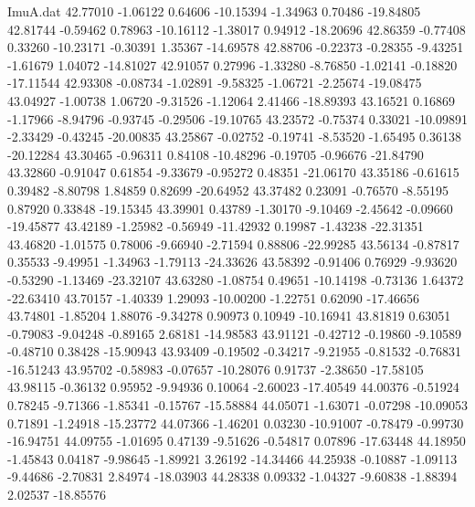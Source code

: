 \begin{filecontents}{ImuA.dat}
  42.77010   -1.06122    0.64606  -10.15394   -1.34963    0.70486  -19.84805
  42.81744   -0.59462    0.78963  -10.16112   -1.38017    0.94912  -18.20696
  42.86359   -0.77408    0.33260  -10.23171   -0.30391    1.35367  -14.69578
  42.88706   -0.22373   -0.28355   -9.43251   -1.61679    1.04072  -14.81027
  42.91057    0.27996   -1.33280   -8.76850   -1.02141   -0.18820  -17.11544
  42.93308   -0.08734   -1.02891   -9.58325   -1.06721   -2.25674  -19.08475
  43.04927   -1.00738    1.06720   -9.31526   -1.12064    2.41466  -18.89393
  43.16521    0.16869   -1.17966   -8.94796   -0.93745   -0.29506  -19.10765
  43.23572   -0.75374    0.33021  -10.09891   -2.33429   -0.43245  -20.00835
  43.25867   -0.02752   -0.19741   -8.53520   -1.65495    0.36138  -20.12284
  43.30465   -0.96311    0.84108  -10.48296   -0.19705   -0.96676  -21.84790
  43.32860   -0.91047    0.61854   -9.33679   -0.95272    0.48351  -21.06170
  43.35186   -0.61615    0.39482   -8.80798    1.84859    0.82699  -20.64952
  43.37482    0.23091   -0.76570   -8.55195    0.87920    0.33848  -19.15345
  43.39901    0.43789   -1.30170   -9.10469   -2.45642   -0.09660  -19.45877
  43.42189   -1.25982   -0.56949  -11.42932    0.19987   -1.43238  -22.31351
  43.46820   -1.01575    0.78006   -9.66940   -2.71594    0.88806  -22.99285
  43.56134   -0.87817    0.35533   -9.49951   -1.34963   -1.79113  -24.33626
  43.58392   -0.91406    0.76929   -9.93620   -0.53290   -1.13469  -23.32107
  43.63280   -1.08754    0.49651  -10.14198   -0.73136    1.64372  -22.63410
  43.70157   -1.40339    1.29093  -10.00200   -1.22751    0.62090  -17.46656
  43.74801   -1.85204    1.88076   -9.34278    0.90973    0.10949  -10.16941
  43.81819    0.63051   -0.79083   -9.04248   -0.89165    2.68181  -14.98583
  43.91121   -0.42712   -0.19860   -9.10589   -0.48710    0.38428  -15.90943
  43.93409   -0.19502   -0.34217   -9.21955   -0.81532   -0.76831  -16.51243
  43.95702   -0.58983   -0.07657  -10.28076    0.91737   -2.38650  -17.58105
  43.98115   -0.36132    0.95952   -9.94936    0.10064   -2.60023  -17.40549
  44.00376   -0.51924    0.78245   -9.71366   -1.85341   -0.15767  -15.58884
  44.05071   -1.63071   -0.07298  -10.09053    0.71891   -1.24918  -15.23772
  44.07366   -1.46201    0.03230  -10.91007   -0.78479   -0.99730  -16.94751
  44.09755   -1.01695    0.47139   -9.51626   -0.54817    0.07896  -17.63448
  44.18950   -1.45843    0.04187   -9.98645   -1.89921    3.26192  -14.34466
  44.25938   -0.10887   -1.09113   -9.44686   -2.70831    2.84974  -18.03903
  44.28338    0.09332   -1.04327   -9.60838   -1.88394    2.02537  -18.85576

\end{filecontents}
